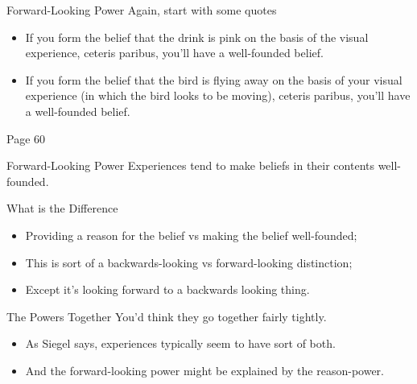 \documentclass[
  17pt,
  letterpaper,
  ignorenonframetext,
  aspectratio=169,
  xcolor={dvipsnames}]{beamer}
\providecommand{\tightlist}{%
  \setlength{\itemsep}{0pt}\setlength{\parskip}{0pt}}\usepackage{longtable,booktabs,array}
\begin{document}
\begin{frame}{Forward-Looking Power}
\protect\hypertarget{forward-looking-power}{}
Again, start with some quotes

\end{frame} \begin{frame}[plain]

\begin{itemize}[<+->]
\tightlist
\item
  If you form the belief that the drink is pink on the basis of the
  visual experience, ceteris paribus, you'll have a well-founded
  belief.\\
\item
  If you form the belief that the bird is flying away on the basis of
  your visual experience (in which the bird looks to be moving), ceteris
  paribus, you'll have a well-founded belief.
\end{itemize}

Page 60
\end{frame}

\begin{frame}{Forward-Looking Power}
\protect\hypertarget{forward-looking-power-1}{}
Experiences tend to make beliefs in their contents well-founded.
\end{frame}

\begin{frame}{What is the Difference}
\protect\hypertarget{what-is-the-difference}{}
\begin{itemize}[<+->]
\tightlist
\item
  Providing a reason for the belief vs making the belief well-founded;
\item
  This is sort of a backwards-looking vs forward-looking distinction;
\item
  Except it's looking forward to a backwards looking thing.
\end{itemize}
\end{frame}

\begin{frame}{The Powers Together}
\protect\hypertarget{the-powers-together}{}
You'd think they go together fairly tightly.

\begin{itemize}[<+->]
\tightlist
\item
  As Siegel says, experiences typically seem to have sort of both.
\item
  And the forward-looking power might be explained by the reason-power.
\end{itemize}
\end{frame}
\end{document}
